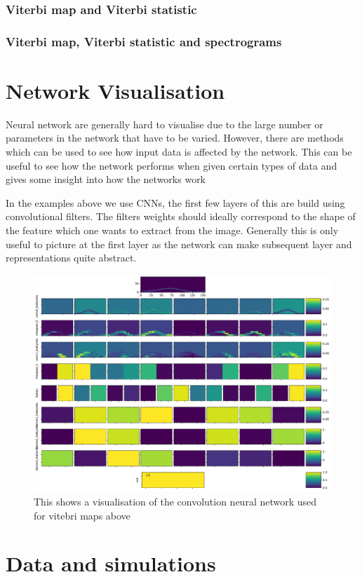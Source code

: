 \subsubsection{Viterbi map and Viterbi statistic}

\subsubsection{Viterbi map, Viterbi statistic and spectrograms}

\section{\label{cnn:networkvis}Network Visualisation}

Neural network are generally hard to visualise due to the large number or parameters in the network that have to be varied.
However, there are methods which can be used to see how input data is affected by the network.
This can be useful to see how the network performs when given certain types of data and gives some insight into how the networks work

In the examples above we use \acp{CNN}, the first few layers of this are build using convolutional filters.
The filters weights should ideally correspond to the shape of the feature which one wants to extract from the image. 
Generally this is only useful to picture at the first layer as the network can make subsequent layer and representations quite abstract.



\begin{figure}[h]
	\centering
	\includegraphics[width=\textwidth]{C4_cnn/vitmap_cnn_visualisation_signal.pdf}
	\caption{This shows a visualisation of the convolution neural network used for vitebri maps above}
	\label{cnn:vis:vitmap:signal}
\end{figure}


\section{Data and simulations}
